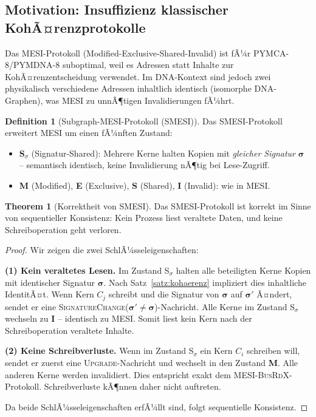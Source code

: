 ﻿\documentclass[a4paper,12pt]{article}
\theoremstyle{definition}
\newtheorem{definition}{Definition}[section]
\newtheorem{theorem}{Theorem}[section]
\begin{document}
\subsection{Motivation: Insuffizienz klassischer KohÃ¤renzprotokolle}

Das MESI-Protokoll (Modified-Exclusive-Shared-Invalid) ist fÃ¼r
PYMCA-8/PYMDNA-8 suboptimal, weil es Adressen statt Inhalte zur
KohÃ¤renzentscheidung verwendet. Im DNA-Kontext sind jedoch zwei
physikalisch verschiedene Adressen inhaltlich identisch (isomorphe
DNA-Graphen), was MESI zu unnÃ¶tigen Invalidierungen fÃ¼hrt.

\begin{definition}[Subgraph-MESI-Protokoll (SMESI)]
  \label{def:smesi}
  Das SMESI-Protokoll erweitert MESI um einen fÃ¼nften Zustand:
  \begin{itemize}[noitemsep]
    \item \textbf{S$_\sigma$} (Signatur-Shared): Mehrere Kerne halten
      Kopien mit \emph{gleicher Signatur} $\boldsymbol{\sigma}$ --
      semantisch identisch, keine Invalidierung nÃ¶tig bei Lese-Zugriff.
    \item \textbf{M} (Modified), \textbf{E} (Exclusive), \textbf{S} (Shared),
      \textbf{I} (Invalid): wie in MESI.
  \end{itemize}
\end{definition}

\begin{theorem}[Korrektheit von SMESI]
  \label{thm:smesi_korrekt}
  Das SMESI-Protokoll ist korrekt im Sinne von sequentieller Konsistenz:
  Kein Prozess liest veraltete Daten, und keine Schreiboperation geht verloren.
\end{theorem}

\begin{proof}
  Wir zeigen die zwei SchlÃ¼sseleigenschaften:

  \textbf{(1) Kein veraltetes Lesen.} Im Zustand S$_\sigma$ halten alle
  beteiligten Kerne Kopien mit identischer Signatur $\boldsymbol{\sigma}$.
  Nach Satz~\ref{satz:kohaerenz} impliziert dies inhaltliche IdentitÃ¤t.
  Wenn Kern $C_j$ schreibt und die Signatur von $\boldsymbol{\sigma}$ auf
  $\boldsymbol{\sigma}'$ Ã¤ndert, sendet er eine
  \textsc{SignatureChange}($\boldsymbol{\sigma}' \neq \boldsymbol{\sigma}$)-Nachricht.
  Alle Kerne im Zustand S$_\sigma$ wechseln zu \textbf{I} -- identisch zu MESI.
  Somit liest kein Kern nach der Schreiboperation veraltete Inhalte.

  \textbf{(2) Keine Schreibverluste.} Wenn im Zustand S$_\sigma$ ein Kern
  $C_i$ schreiben will, sendet er zuerst eine \textsc{Upgrade}-Nachricht
  und wechselt in den Zustand \textbf{M}. Alle anderen Kerne werden
  invalidiert. Dies entspricht exakt dem MESI-\textsc{BusRdX}-Protokoll.
  Schreibverluste kÃ¶nnen daher nicht auftreten.

  Da beide SchlÃ¼sseleigenschaften erfÃ¼llt sind, folgt sequentielle Konsistenz.
\end{proof}
\end{document}
